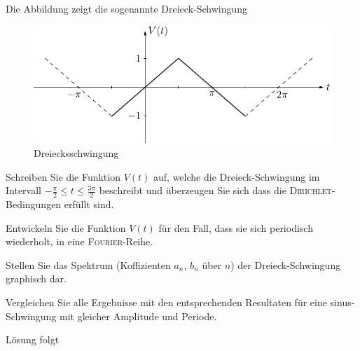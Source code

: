\documentclass{atistandalonetask}
\begin{document}
  \begin{atiTask}[
    title = Dreiecksschwingung
  ]
	Die Abbildung zeigt die sogenannte Dreieck-Schwingung
	\begin{figure}[H]
	\centering
	\includegraphics[width=0.7\linewidth]{picture-fourier_iii}
	\caption{Dreiecksschwingung}
	\end{figure}

	\begin{atiSubtasks}
		\item
		Schreiben Sie die Funktion $V(t)$ auf, welche die Dreieck-Schwingung im Intervall $-\frac{\pi}{2}\leq t\leq \frac{3\pi}{2}$ beschreibt und überzeugen Sie sich dass die \textsc{Dirichlet}-Bedingungen erfüllt sind.
		\item Entwickeln Sie die Funktion $V(t)$ für den Fall, dass sie sich periodisch wiederholt, in eine \textsc{Fourier}-Reihe. 
		\item Stellen Sie das Spektrum (Koffizienten $a_n$, $b_n$ über $n$) der Dreieck-Schwingung graphisch dar.
		\item Vergleichen Sie alle Ergebnisse mit den entsprechenden Resultaten für eine sinus-Schwingung mit gleicher Amplitude und Periode. 
	\end{atiSubtasks} 
  \end{atiTask}
  \begin{atiSolution}
   Lösung folgt
  \end{atiSolution}
\end{document}
